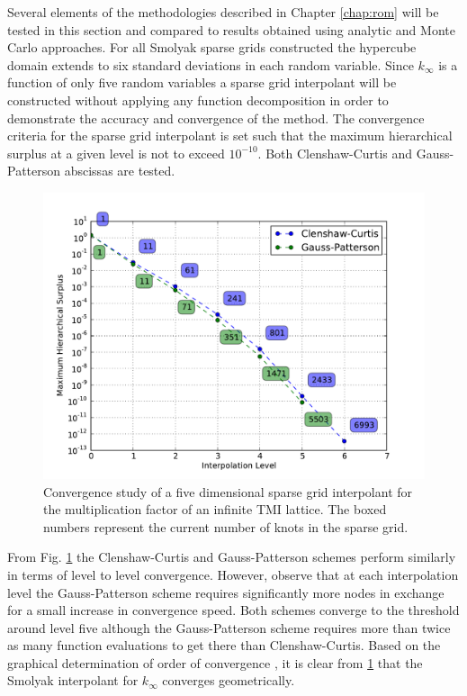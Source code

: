 Several elements of the methodologies described in Chapter \ref{chap:rom} will be tested in this section and compared to results obtained using analytic and Monte Carlo approaches. For all Smolyak sparse grids constructed the hypercube domain extends to six standard deviations in each random variable. Since $k_{\infty}$ is a function of only five random variables a sparse grid interpolant will be constructed without applying any function decomposition in order to demonstrate the accuracy and convergence of the method. The convergence criteria for the sparse grid interpolant is set such that the maximum hierarchical surplus at a given level is not to exceed $10^{-10}$. Both Clenshaw-Curtis and Gauss-Patterson abscissas are tested. 
\begin{figure}
\caption[Hierarchical surplus convergence for infinite TMI lattice.]{ \label{fig:kinf_sg_convergence}
Convergence study of a five dimensional sparse grid interpolant for the  multiplication factor of an infinite TMI lattice. The boxed numbers represent the current number of knots in the sparse grid.}
 \begin{center}
  \includegraphics[scale=.75]{./Chapter3/kinf_sparse_grid_convergence.pdf}
 \end{center}
\end{figure}

From Fig. \ref{fig:kinf_sg_convergence} the Clenshaw-Curtis and Gauss-Patterson schemes perform similarly in terms of level to level convergence. However, observe that at each interpolation level the Gauss-Patterson scheme requires significantly more nodes in exchange for a small increase in convergence speed. Both schemes converge to the threshold around level five although the Gauss-Patterson scheme requires more than twice as many function evaluations to get there than Clenshaw-Curtis. Based on the graphical determination of order of convergence \cite{Boyd}, it is clear from \ref{fig:kinf_sg_convergence} that the Smolyak interpolant for $k_{\infty}$ converges geometrically.

